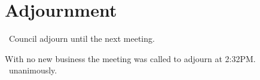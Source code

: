 \section*{Adjournment}

\begin{motion}
    \birt\ Council adjourn until the next meeting.
    \movers{\elizebeth}{\senecca}

    With no new business the meeting was called to adjourn at 2:32PM.%
    \carries\ unanimously.
\end{motion}

